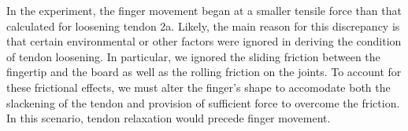 \documentclass{llncs}
\begin{document}

In the experiment, the finger movement began at a smaller tensile force than that calculated for loosening tendon 2a.
Likely, the main reason for this discrepancy is that certain environmental or other factors were ignored in deriving the condition of tendon loosening.
In particular, we ignored the sliding friction between the fingertip and the board as well as the rolling friction on the joints.
To account for these frictional effects, we must alter the finger's shape to accomodate both the slackening of the tendon and provision of sufficient force to overcome the friction.
In this scenario, tendon relaxation would precede finger movement.
\end{document}
